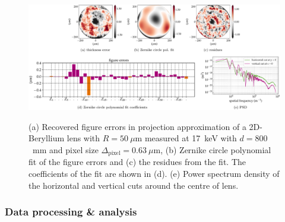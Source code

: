 \begin{refsection}
\begin{figure}[t]
        \centering
        {\includegraphics[width=1\linewidth]{figures/ch04b/recovered_thickness.pdf}}
        \caption[Recovered figure errors in projection approximation]{(a) Recovered figure errors in projection approximation of a 2D-Beryllium lens with $R=50~\mu$m measured at 17~keV with $d=800$~mm and pixel size $\Delta_\text{pixel}= 0.63~\mu$m, (b) Zernike circle polynomial fit of the figure errors and (c) the residues from the fit. The coefficients of the fit are shown in (d). (e) Power spectrum density of the horizontal and vertical cuts around the centre of lens.}\label{fig:recovered_thickness}
\end{figure}

\subsubsection*{Data processing \& analysis}


\end{refsection}
